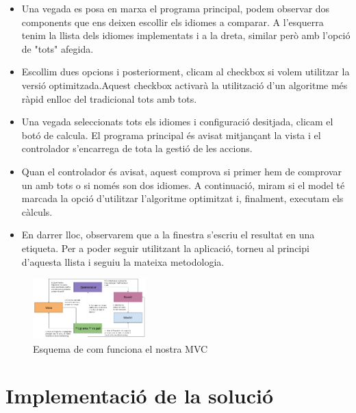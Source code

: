 \documentclass[conference]{IEEEtran}
\begin{document}
 \begin{itemize}
    \item Una vegada es posa en marxa el programa principal, podem observar dos components que ens deixen escollir els idiomes a comparar. A l'esquerra tenim la llista dels idiomes implementats i a la dreta, similar però amb l'opció de "tots" afegida.\\

    \item Escollim dues opcions i posteriorment, clicam al checkbox si volem utilitzar la versió optimitzada.Aquest checkbox activarà la utilització d'un algoritme més ràpid enlloc del tradicional tots amb tots.\\

    \item Una vegada seleccionats tots els idiomes i configuració desitjada, clicam el botó de calcula. El programa principal és avisat mitjançant la vista i el controlador s'encarrega de tota la gestió de les accions.\\

    \item Quan el controlador és avisat, aquest comprova si primer hem de comprovar un amb tots o si només son dos idiomes. A continuació, miram si el model té marcada la opció d'utilitzar l'algoritme optimitzat i, finalment, executam els càlculs.\\

    \item En darrer lloc, observarem que a la finestra s'escriu el resultat en una etiqueta. Per a poder seguir utilitzant la aplicació, torneu al principi d'aquesta llista i seguiu la mateixa metodologia.\\

\end{itemize}

\begin{figure}[ht]
    \centering
    \includegraphics[width=0.388\textwidth]{images/MVC.png}
    \caption{Esquema de com funciona el nostra MVC}
\end{figure}

\section{Implementació de la solució}
\end{document}
